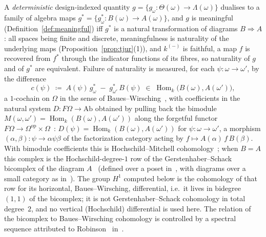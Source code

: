 \documentclass[11pt,a4paper]{article}
\theoremstyle{plain}
\theoremstyle{definition}
\theoremstyle{remark}
\newcommand{\cat}[1]{\mathsf{#1}}
\newcommand{\catO}{\cat{\Omega}}
\newcommand{\op}{\mathrm{op}}
\DeclareMathOperator{\Hom}{Hom}
\begin{document}
A \emph{deterministic} design-indexed quantity $g = \{g_\omega \colon
\Theta(\omega) \to \Lambda(\omega)\}$ dualises to a family of algebra maps
$g^{*} = \{g_\omega^{*} \colon B(\omega) \to A(\omega)\}$, and $g$ is
meaningful (Definition~\ref{def:meaningful}) iff $g^{*}$ is a natural
transformation of diagrams $B \Rightarrow A$: all spaces being finite and
discrete, meaningfulness is naturality of the underlying maps
(Proposition~\ref{prop:tjur}(1)), and $k^{(-)}$ is faithful, a map $f$ is
recovered from $f^{*}$ through the indicator functions of its fibres, so
naturality of $g$ and of $g^{*}$ are equivalent. Failure of naturality is
measured, for each $\psi \colon \omega \to \omega'$, by the difference
\begin{equation}\label{eq:defect}
c(\psi) \;\coloneqq\; A(\psi)\, g_{\omega}^{*} \;-\; g_{\omega'}^{*}\, B(\psi)
\;\in\; \Hom_k\bigl(B(\omega), A(\omega')\bigr),
\end{equation}
a $1$-cochain on $\catO$ in the sense of
Baues--Wirsching~\cite[(1.4)]{baues_cohomology_1985}, with coefficients in
the natural system $D \colon F\catO \to \mathrm{Ab}$ obtained by pulling
back the bimodule $M(\omega,\omega') = \Hom_k(B(\omega),A(\omega'))$
along the forgetful functor
$F\catO \to \catO^{\op} \times \catO$~\cite[(1.16)--(1.18)]{baues_cohomology_1985}:
$D(\psi) = \Hom_k(B(\omega),A(\omega'))$ for $\psi \colon \omega \to
\omega'$, a morphism $(\alpha,\beta) \colon \psi \to \alpha\psi\beta$ of
the factorization category acting by $f \mapsto A(\alpha)\,f\,B(\beta)$. With
bimodule coefficients this is Hochschild--Mitchell
cohomology~\cite[(8.5)]{baues_cohomology_1985}; when
$B = A$ this complex is the Hochschild-degree-$1$ row of the Gerstenhaber--Schack
bicomplex of the diagram $A$~\cite[Prop.~3.8]{caputi_diagrammatic_2025} (defined
over a poset in~\cite{gerstenhaber_schack_1983}, with diagrams over a small
category as in~\cite{gerstenhaber_simplicial_1983}). The group $H^{1}$
computed below is the cohomology of that row for its horizontal,
Baues--Wirsching, differential, i.e.\ it lives in bidegree $(1,1)$ of the
bicomplex; it is not Gerstenhaber--Schack cohomology in total degree~$2$, and
no vertical (Hochschild) differential is used here. The relation of the
bicomplex to Baues--Wirsching cohomology is controlled by a spectral sequence
attributed to Robinson~\cite{robinson_cohomology_2008}
in~\cite[\S1, Thm.~3.11]{caputi_diagrammatic_2025}.
\end{document}
